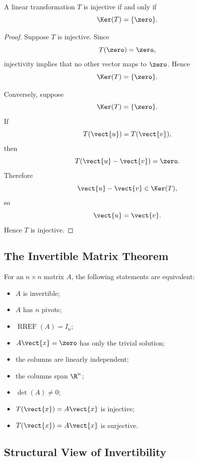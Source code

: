 \begin{theorem}
A linear transformation \(T\) is injective if and only if
\[ \Ker(T)=\{\zero\}. \]
\end{theorem}

\begin{proof}
Suppose \(T\) is injective. Since
\[ T(\zero)=\zero, \]
injectivity implies that no other vector maps to \(\zero\). Hence
\[ \Ker(T)=\{\zero\}. \]

Conversely, suppose
\[ \Ker(T)=\{\zero\}. \]
If
\[ T(\vect{u})=T(\vect{v}), \]
then
\[ T(\vect{u}-\vect{v})=\zero. \]
Therefore
\[ \vect{u}-\vect{v}\in\Ker(T), \]
so
\[ \vect{u}=\vect{v}. \]
Hence \(T\) is injective.
\end{proof}

\subsection{The Invertible Matrix Theorem}
\label{subsec:invertible-matrix-theorem}

For an \(n\times n\) matrix \(A\), the following statements are equivalent:

\begin{itemize}
    \item \(A\) is invertible;
    \item \(A\) has \(n\) pivots;
    \item \(\operatorname{RREF}(A)=I_n\);
    \item \(A\vect{x}=\zero\) has only the trivial solution;
    \item the columns are linearly independent;
    \item the columns span \(\R^n\);
    \item \(\det(A)\neq0\);
    \item \(T(\vect{x})=A\vect{x}\) is injective;
    \item \(T(\vect{x})=A\vect{x}\) is surjective.
\end{itemize}

\subsection{Structural View of Invertibility}
\label{subsec:visual-invertibility}

